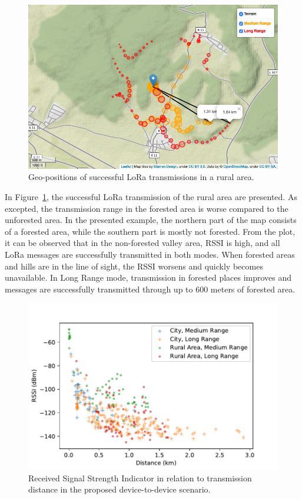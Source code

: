 \begin{figure}[ht!]
    \centering
    \includegraphics[width=\textwidth]{gfx/rural.png}
    \caption{Geo-positions of successful LoRa transmissions in a rural area.}
    \label{fig:eval_rural_new}
\end{figure}

In Figure~\ref{fig:eval_rural_new}, the successful LoRa transmission of the rural area are presented.
As excepted, the transmission range in the forested area is worse compared to the unforested area.
In the presented example, the northern part of the map consists of a forested area, while the southern part is mostly not forested.
From the plot, it can be observed that in the non-forested valley area, RSSI is high, and all LoRa messages are successfully transmitted in both modes. 
When forested areas and hills are in the line of sight, the RSSI worsens and quickly becomes unavailable.
In Long Range mode, transmission in forested places improves and messages are successfully transmitted through up to 600 meters of forested area.

\begin{figure}[ht!]
    \centering
    \includegraphics[width=.8\textwidth]{gfx/rssi-distance.pdf}
    \caption{Received Signal Strength Indicator in relation to transmission distance in the proposed device-to-device scenario.}
    \label{fig:eval_rssi}
\end{figure}

